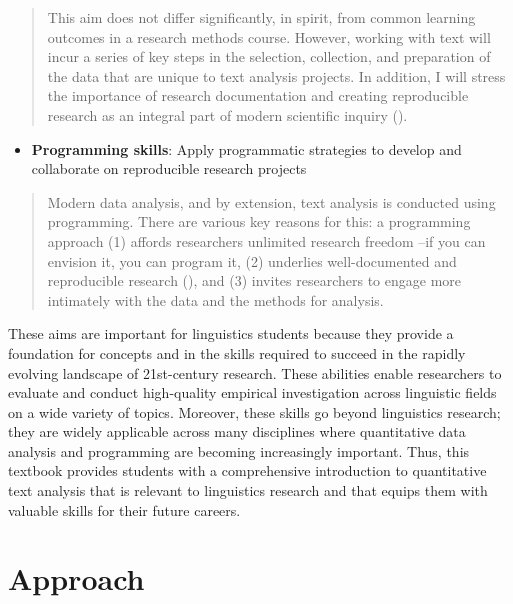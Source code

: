 \documentclass[
  letterpaper,
  DIV=11,
  numbers=noendperiod]{scrreprt}
\providecommand{\tightlist}{%
  \setlength{\itemsep}{0pt}\setlength{\parskip}{0pt}}\usepackage{longtable,booktabs,array}
\theoremstyle{definition}
\theoremstyle{remark}
\begin{document}
\begin{quote}
This aim does not differ significantly, in spirit, from common learning
outcomes in a research methods course. However, working with text will
incur a series of key steps in the selection, collection, and
preparation of the data that are unique to text analysis projects. In
addition, I will stress the importance of research documentation and
creating reproducible research as an integral part of modern scientific
inquiry ().
\end{quote}

\begin{itemize}
\tightlist
\item
  \textbf{Programming skills}: Apply programmatic strategies to develop
  and collaborate on reproducible research projects
\end{itemize}

\begin{quote}
Modern data analysis, and by extension, text analysis is conducted using
programming. There are various key reasons for this: a programming
approach (1) affords researchers unlimited research freedom --if you can
envision it, you can program it, (2) underlies well-documented and
reproducible research (), and
(3) invites researchers to engage more intimately with the data and the
methods for analysis.
\end{quote}

These aims are important for linguistics students because they provide a
foundation for concepts and in the skills required to succeed in the
rapidly evolving landscape of 21st-century research. These abilities
enable researchers to evaluate and conduct high-quality empirical
investigation across linguistic fields on a wide variety of topics.
Moreover, these skills go beyond linguistics research; they are widely
applicable across many disciplines where quantitative data analysis and
programming are becoming increasingly important. Thus, this textbook
provides students with a comprehensive introduction to quantitative text
analysis that is relevant to linguistics research and that equips them
with valuable skills for their future careers.

\section*{Approach}\label{sec-p-approach}
\end{document}
